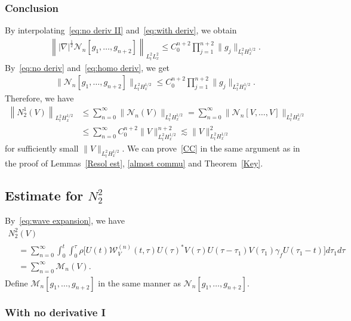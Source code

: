 \documentclass[10pt,a4paper]{amsart}
\newcommand{\CM}{\mathcal{M}}
\newcommand{\CN}{\mathcal{N}}
\newcommand{\CW}{\mathcal{W}}
\newcommand{\ga}{\gamma}
\newcommand{\ta}{\tau}
\newcommand{\rh}{\rho}
\newcommand{\I}{\infty}
\newcommand{\tw}{\frac{1}{2}}
\newcommand{\na}{\nabla}
\newcommand{\ls}{\lesssim}
\begin{document}
\subsubsection{Conclusion} 

By interpolating~\eqref{eq:no deriv II} and~\eqref{eq:with deriv}, we obtain
\begin{align}\label{eq:homo deriv}
\left\||\na|^\tw \CN_n[g_1,\dots,g_{n+2}]\right\|_{L^2_t L^2_x} \le C_0^{n+2} \prod_{j=1}^{n+2} \|g_j\|_{L^2_t H^{1/2}_x}.
\end{align}
By~\eqref{eq:no deriv} and~\eqref{eq:homo deriv}, we get
\begin{align}
\|\CN_n [g_1,\dots,g_{n+2}]\|_{L^2_t H^{1/2}_x} \le C_0^{n+2} \prod_{j=1}^{n+2} \|g_j\|_{L^2_t H^{1/2}_x}.
\end{align}
Therefore, we have
\begin{equation}
\begin{split}
\left\|N_2^1(V)\right\|_{L^2_t H^{1/2}_x} &\le \sum_{n=0}^\I \|\CN_n(V)\|_{L^2_t H^{1/2}_x} = \sum_{n=0}^\I \|\CN_n[V,\dots,V]\|_{L^2_t H^{1/2}_x} \\
&\le \sum_{n=0}^\I C_0^{n+2} \|V\|_{L^2_t H^{1/2}_x}^{n+2}
\ls \|V\|_{L^2_t H^{1/2}_x}^2
\end{split}
\end{equation}
for sufficiently small $\|V\|_{L^2_t H^{1/2}_x}$. We can prove~\eqref{CC} in the same argument as in the proof of Lemmas~\ref{Resol est}, \ref{almost commu} and Theorem~\ref{Key}.


\subsection{Estimate for \texorpdfstring{$N_2^2$}{N22}} 

By~\eqref{eq:wave expansion}, we have
\begin{multline}
N_2^2(V)\\
\begin{aligned}
 &= \sum_{n=0}^\I \int_0^t \int_0^\ta
\rh \Big[U(t) \CW_V^{(n)}(t,\ta)U(\ta)^* V(\ta)U(\ta-\ta_1) V(\ta_1) \ga_f U(\ta_1-t) \Big] d\ta_1 d\ta \\
&= \sum_{n=0}^\I \CM_n(V).
\end{aligned}
\end{multline}
Define $\CM_n[g_1, \dots, g_{n+2}]$ in the same manner as $\CN_n[g_1,\dots, g_{n+2}]$.

\subsubsection{With no derivative I} 
\end{document}
